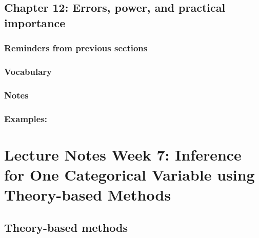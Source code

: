 \documentclass[
]{report}
\begin{document}
\hypertarget{chapter-12-errors-power-and-practical-importance}{%
\subsection*{Chapter 12: Errors, power, and practical importance}\label{chapter-12-errors-power-and-practical-importance}}

\hypertarget{reminders-from-previous-sections-6}{%
\subsubsection*{Reminders from previous sections}\label{reminders-from-previous-sections-6}}

\hypertarget{vocabulary-15}{%
\subsubsection*{Vocabulary}\label{vocabulary-15}}

\hypertarget{notes-19}{%
\subsubsection*{Notes}\label{notes-19}}

\hypertarget{examples-1}{%
\subsubsection*{Examples:}\label{examples-1}}

\hypertarget{lecture-notes-week-7-inference-for-one-categorical-variable-using-theory-based-methods}{%
\section{Lecture Notes Week 7: Inference for One Categorical Variable using Theory-based Methods}\label{lecture-notes-week-7-inference-for-one-categorical-variable-using-theory-based-methods}}

\hypertarget{theory-based-methods}{%
\subsection*{Theory-based methods}\label{theory-based-methods}}
\end{document}
